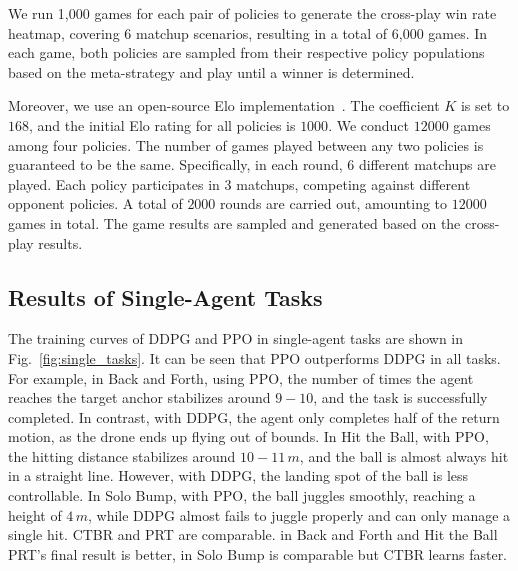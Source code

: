 We run 1,000 games for each pair of policies to generate the cross-play win rate heatmap, covering 6 matchup scenarios, resulting in a total of 6,000 games. In each game, both policies are sampled from their respective policy populations based on the meta-strategy and play until a winner is determined.

Moreover, we use an open-source Elo implementation~\cite{HankSheehan_EloPy}. The coefficient $K$ is set to $168$, and the initial Elo rating for all policies is $1000$. We conduct $12000$ games among four policies. The number of games played between any two policies is guaranteed to be the same. Specifically, in each round, $6$ different matchups are played. Each policy participates in 3 matchups, competing against different opponent policies. A total of $2000$ rounds are carried out, amounting to $12000$ games in total. The game results are sampled and generated based on the cross-play results.

\subsection{Results of Single-Agent Tasks}
\label{app:single}


The training curves of DDPG and PPO in single-agent tasks are shown in Fig.~\ref{fig:single_tasks}. It can be seen that PPO outperforms DDPG in all tasks. For example, in Back and Forth, using PPO, the number of times the agent reaches the target anchor stabilizes around $9-10$, and the task is successfully completed. In contrast, with DDPG, the agent only completes half of the return motion, as the drone ends up flying out of bounds. In Hit the Ball, with PPO, the hitting distance stabilizes around $10-11\,m$, and the ball is almost always hit in a straight line. However, with DDPG, the landing spot of the ball is less controllable. In Solo Bump, with PPO, the ball juggles smoothly, reaching a height of $4\,m$, while DDPG almost fails to juggle properly and can only manage a single hit. CTBR and PRT are comparable. in Back and Forth and Hit the Ball PRT's final result is better, in Solo Bump is comparable but CTBR learns faster.



